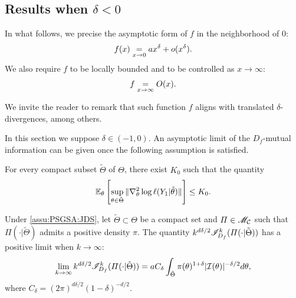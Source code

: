 \subsection{Results when $\delta<0$}

In what follows, we precise the asymptotic form of $f$ in the neighborhood of $0$:
    \begin{equation}
        f(x) \overset{}{\underset{x\rightarrow0}{=}} a x^\delta + o(x^\delta).
    \end{equation}
We also require $f$ to be locally bounded and to be controlled as $x\to\infty$: 
\begin{equation}
    f\overset{}{\underset{x\rightarrow\infty}{=}}O(x).
\end{equation}

We invite the reader to remark that such function $f$ aligns with translated $\delta$-divergences, among others.

In this section we suppose $\delta\in(-1,0)$. 
An asymptotic limit of the $D_f$-mutual information can be given once the following assumption is satisfied.
\begin{assu}
    \label{assu:PSGSA:JDS}
        For every compact subset $\tilde\Theta$ of $\Theta$,
        there exist $K_0$ such that the quantity 
            \begin{equation}
                \mathbb{E}_\theta\left[\sup_{\theta\in\tilde\Theta}\|\nabla^2_\theta\log\ell(Y_1|\tilde\theta)\|\right] \leq K_0.
            \end{equation}
    \end{assu}


\begin{thm}\label{thm:refcompactneg}
    Under \cref{assu:PSGSA:JDS}, let $\tilde\Theta\subset\Theta$ be a compact set and $\varPi\in\mathscr{M}_{\mathcal{C}}$ such that $\varPi(\cdot|\tilde\Theta)$ admits a positive density $\pi$. 
    The quantity $k^{d\delta/2}\mathscr{I}^k_{D_f}(\varPi(\cdot|\tilde\Theta))$ has a positive limit when $k\to\infty$:
    \begin{align}
    \label{eq:limitkbeta}
            \lim_{k\rightarrow\infty} k^{d\delta/2} \mathscr{I}^k_{D_f}(\varPi(\cdot|\tilde\Theta)) = 
    a C_\delta \int_{\tilde\Theta}\pi(\theta)^{1+\delta} |\mathcal{I}(\theta)|^{-\delta/2}  d\theta ,
        \end{align}
    where $ C_\delta = (2\pi)^{d\delta/2} (1-\delta)^{-d/2}$. 
    \end{thm}

